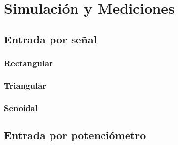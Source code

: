\documentclass{article}
\begin{document}
\section{Simulación y Mediciones}



\subsection{Entrada por señal}

\subsubsection{Rectangular}

\subsubsection{Triangular}

\subsubsection{Senoidal}


\subsection{Entrada por potenciómetro}
\end{document}
